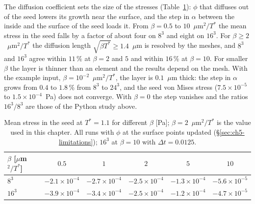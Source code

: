 The diffusion coefficient sets the size of the stresses
(Table~\ref{tab:ch5-beta}): $\phi$ that diffuses out of the seed lowers its
growth near the surface, and the step in $\alpha$ between the inside and the
surface of the seed loads it. From $\beta=0.5$ to $10$~$\mu$m$^2/T^*$ the mean
stress in the seed falls by a factor of about four on $8^3$ and eight on $16^3$.
For $\beta\ge2$~$\mu$m$^2/T^*$ the diffusion
length $\sqrt{\beta T^*}\ge1.4$~$\mu$m is resolved by the meshes, and $8^3$ and
$16^3$ agree within $11\,\%$ at $\beta=2$ and $5$ and within $16\,\%$ at
$\beta=10$. For smaller $\beta$ the layer is thinner than an
element and the results depend on the mesh. With the example input,
$\beta=10^{-2}$~$\mu$m$^2/T^*$, the layer is $0.1$~$\mu$m thick: the step in $\alpha$
grows from $0.4$ to $1.8\,\%$ from $8^3$ to $24^3$, and the seed von Mises
stress ($7.5\times10^{-5}$ to $1.5\times10^{-4}$~Pa) does not converge.
With $\beta=0$ the step vanishes and the ratios $16^3/8^3$ are those of the
Python study above.

\begin{table}[htbp]
  \centering
  \caption[Sensitivity to the diffusion coefficient]{Mean stress in the seed
    at $T^*=1.1$ for different $\beta$ [Pa]; $\beta=2$~$\mu$m$^2/T^*$ is the value used in
    this chapter. All runs with $\phi$ at the surface points updated
    (\S\ref{sec:ch5-limitations}); $16^3$ at $\beta=10$ with
    $\Delta t=0.0125$.}
  \label{tab:ch5-beta}
  \small
  \begin{tabular}{lccccc}
    \toprule
    $\beta$ [$\mu$m$^2/T^*$] & $0.5$ & $1$ & $2$ & $5$ & $10$ \\
    \midrule
    $8^3$ & $-2.1\times10^{-4}$ & $-2.7\times10^{-4}$ & $-2.5\times10^{-4}$ & $-1.3\times10^{-4}$ & $-5.6\times10^{-5}$ \\
    $16^3$ & $-3.9\times10^{-4}$ & $-3.4\times10^{-4}$ & $-2.5\times10^{-4}$ & $-1.2\times10^{-4}$ & $-4.7\times10^{-5}$ \\
    \bottomrule
  \end{tabular}
\end{table}

